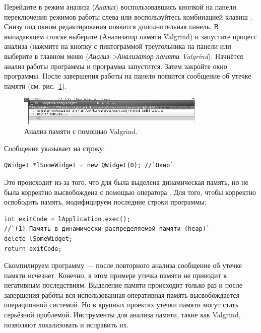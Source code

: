 Перейдите в режим анализа  (\emph{Анализ}) воспользовавшись кнопкой на панели
переключения режимов работы слева или воспользуйтесь комбинацией клавиш . Снизу под окном
редактирования появится дополнительная панель. В выпадающем списке выберите  (Анализатор памяти
Valgrind) и запустите процесс анализа (нажмите на кнопку с пиктограммой треугольника на панели или выберите в главном
меню  (\emph{Анализ->Анализатор памяти Valgrind}). Начнётся анализ работы программы и программа запустится. Затем закройте окно программы. После
завершения работы на панели появится сообщение об утечке памяти (см. рис.~\ref{ch14:refDrawing0}).
\begin{figure}[htb]
\begin{center}
\includegraphics[width=0.8\textwidth]{img/ris_14_1}
\caption[Анализ памяти с помощью Valgrind]{Анализ памяти с помощью Valgrind.}
\label{ch14:refDrawing0}
\end{center}
\end{figure}

Сообщение указывает на строку: 
\begin{lstlisting}
QWidget *lSomeWidget = new QWidget(0); //`Окно`
\end{lstlisting}

Это происходит из-за того, что для  была выделена динамическая память, но не была корректно
высвобождена с помощью оператора . Для того, чтобы корректно освободить память, модифицируем последние
строки программы:
\begin{lstlisting}
int exitCode = lApplication.exec();
//`(1) Память в динамически-распределяемой памяти (heap)`
delete lSomeWidget;
return exitCode;
\end{lstlisting}

Скомпилируем программу --- после повторного анализа сообщение об утечке памяти исчезнет. Конечно, в этом примере утечка
памяти не приводит к негативным последствиям. Выделение памяти происходит только раз и после завершения работы вся
использованная оперативная память высвобождается операционной системой. Но в крупных проектах утечки памяти могут стать
серьёзной проблемой. Инструменты для анализа памяти, такие как Valgrind, позволяют локализовать и исправить их.

